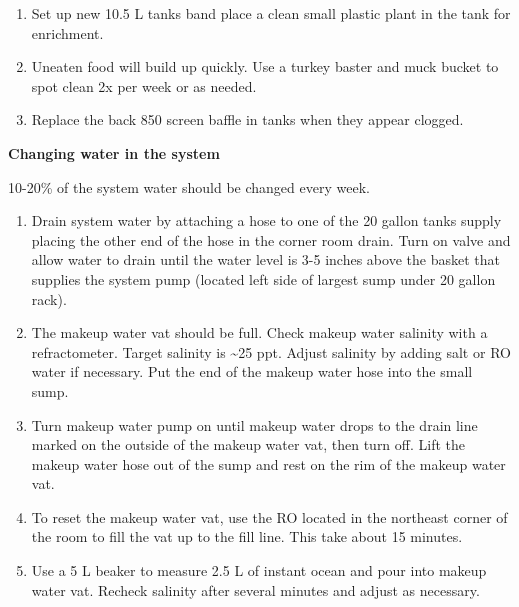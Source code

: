 \documentclass[
  letterpaper,
  DIV=11,
  numbers=noendperiod]{scrreprt}
\providecommand{\tightlist}{%
  \setlength{\itemsep}{0pt}\setlength{\parskip}{0pt}}\usepackage{longtable,booktabs,array}
\begin{document}
\begin{enumerate}
\def\labelenumi{\arabic{enumi}.}
\tightlist
\item
  Set up new 10.5 L tanks band place a clean small plastic plant in the
  tank for enrichment.
\item
  Uneaten food will build up quickly. Use a turkey baster and muck
  bucket to spot clean 2x per week or as needed.
\item
  Replace the back 850 screen baffle in tanks when they appear clogged.
\end{enumerate}

\textbf{Changing water in the system}

\begin{tcolorbox}[enhanced jigsaw, rightrule=.15mm, title=\textcolor{quarto-callout-note-color}{\faInfo}\hspace{0.5em}{NOTE}, titlerule=0mm, opacitybacktitle=0.6, toprule=.15mm, bottomrule=.15mm, opacityback=0, left=2mm, colframe=quarto-callout-note-color-frame, breakable, coltitle=black, colback=white, colbacktitle=quarto-callout-note-color!10!white, bottomtitle=1mm, leftrule=.75mm, toptitle=1mm, arc=.35mm]

10-20\% of the system water should be changed every week.

\end{tcolorbox}

\begin{enumerate}
\def\labelenumi{\arabic{enumi}.}
\tightlist
\item
  Drain system water by attaching a hose to one of the 20 gallon tanks
  supply placing the other end of the hose in the corner room drain.
  Turn on valve and allow water to drain until the water level is 3-5
  inches above the basket that supplies the system pump (located left
  side of largest sump under 20 gallon rack).
\item
  The makeup water vat should be full. Check makeup water salinity with
  a refractometer. Target salinity is \textasciitilde25 ppt. Adjust
  salinity by adding salt or RO water if necessary. Put the end of the
  makeup water hose into the small sump.
\item
  Turn makeup water pump on until makeup water drops to the drain line
  marked on the outside of the makeup water vat, then turn off. Lift the
  makeup water hose out of the sump and rest on the rim of the makeup
  water vat.
\item
  To reset the makeup water vat, use the RO located in the northeast
  corner of the room to fill the vat up to the fill line. This take
  about 15 minutes.
\item
  Use a 5 L beaker to measure 2.5 L of instant ocean and pour into
  makeup water vat. Recheck salinity after several minutes and adjust as
  necessary.
\end{enumerate}
\end{document}
